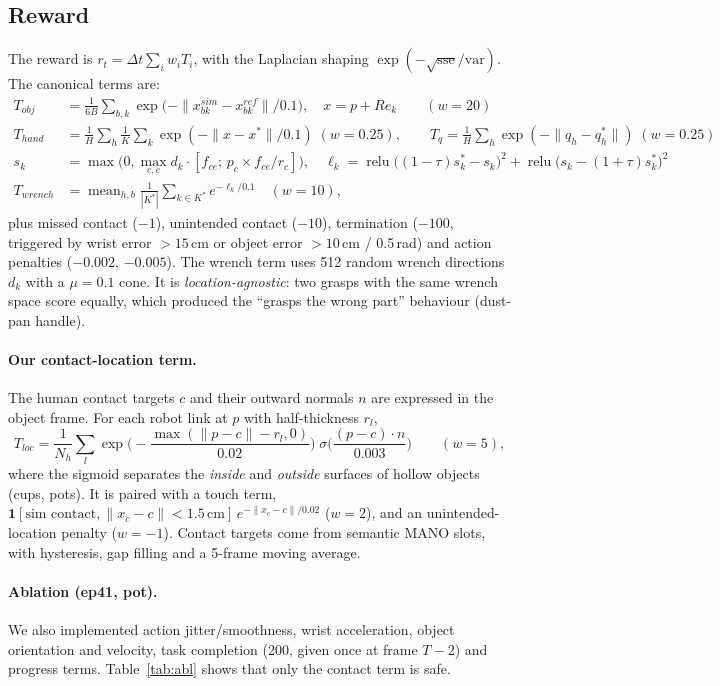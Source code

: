 \documentclass[10pt,a4paper]{article}
\newcommand{\relu}{\operatorname{relu}}
\begin{document}
\subsection{Reward}
The reward is $r_t=\Delta t\sum_i w_iT_i$, with the Laplacian shaping $\exp(-\sqrt{\mathrm{sse}}/\mathrm{var})$. The canonical terms are:
\begin{align}
T_{obj}&=\tfrac1{6B}\textstyle\sum_{b,k}\exp\!\big(-\|x^{sim}_{bk}-x^{ref}_{bk}\|/0.1\big),\quad x=p+Re_k \hspace{2em}(w=20)\\
T_{hand}&=\tfrac1H\textstyle\sum_h\tfrac1K\sum_k\exp(-\|x-x^*\|/0.1)\;(w=0.25),\qquad T_{q}=\tfrac1H\sum_h\exp(-\|q_h-q_h^*\|)\;(w=0.25)\\
s_k&=\max\!\big(0,\max_{c,e}d_k\cdot[f_{ce};\,p_c\times f_{ce}/r_c]\big),\quad
\ell_k=\relu\big((1-\tau)s_k^*-s_k\big)^2+\relu\big(s_k-(1+\tau)s_k^*\big)^2\\
T_{wrench}&=\operatorname{mean}_{h,b}\tfrac1{|K^*|}\textstyle\sum_{k\in K^*}e^{-\ell_k/0.1}\quad(w=10),
\end{align}
plus missed contact ($-1$), unintended contact ($-10$), termination ($-100$, triggered by wrist error $>15$\,cm or object error $>10$\,cm / 0.5\,rad) and action
penalties ($-0.002$, $-0.005$). The wrench term uses 512 random wrench directions $d_k$ with a $\mu=0.1$ cone.
It is \emph{location-agnostic}: two grasps with the same wrench space score equally, which produced
the ``grasps the wrong part'' behaviour (dust-pan handle).

\paragraph{Our contact-location term.} The human contact targets $c$ and their outward normals $n$ are expressed in the object frame. For each robot
link at $p$ with half-thickness $r_l$,
\begin{equation}
T_{loc}=\frac1{N_h}\sum_l \exp\!\Big(-\frac{\max(\|p-c\|-r_l,0)}{0.02}\Big)\;\sigma\!\Big(\frac{(p-c)\cdot n}{0.003}\Big)\qquad(w=5),
\end{equation}
where the sigmoid separates the \emph{inside} and \emph{outside} surfaces of hollow objects (cups, pots). It is paired with
a touch term, $\mathbf 1[\text{sim contact},\|x_c-c\|<1.5\,\text{cm}]\,e^{-\|x_c-c\|/0.02}$ ($w=2$), and an unintended-location penalty ($w=-1$).
Contact targets come from semantic MANO slots, with hysteresis, gap filling and a 5-frame moving average.

\paragraph{Ablation (ep41, pot).} We also implemented action jitter/smoothness, wrist acceleration, object orientation and velocity,
task completion (200, given once at frame $T-2$) and progress terms. Table~\ref{tab:abl} shows that only the contact term is safe.
\end{document}
